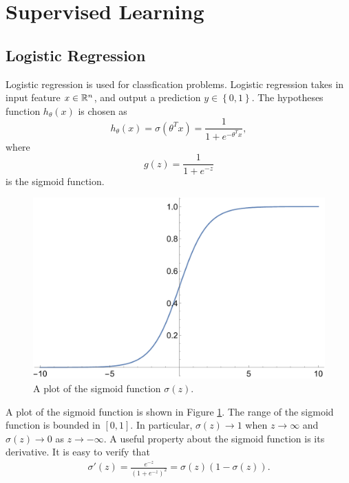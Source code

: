 \documentclass[a4paper]{article}
\begin{document}
\maketitle

\tableofcontents

\section{Supervised Learning}

\subsection{Logistic Regression}
Logistic regression is used for classfication problems.
Logistic regression takes in input feature $x \in \mathbb{R}^n$, and 
output a prediction $y \in \left\{ 0, 1 \right\}$. 
The hypotheses function $h_{\theta}(x)$ is chosen as 
\[
h_\theta(x) = \sigma(\theta^T x) = \frac{1}{1 + e^{- \theta^T x}},
\]
where 
\[
g(z) = \frac{1}{1 + e^{-z}}
\]
is the sigmoid function. 

\begin{figure}[H]
  \centering
  \includegraphics[width=0.5\linewidth]{fig/sigmoid.pdf}
  \caption{A plot of the sigmoid function $\sigma(z)$.}
  \label{sigmoid}
\end{figure}

A plot of the sigmoid function is shown in Figure 
\ref{sigmoid}. The range of the sigmoid function is bounded
in $[0, 1]$. In particular, $\sigma(z) \to 1$ when $z \to \infty$
and $\sigma(z) \to 0$ as $z \to - \infty$. A useful property
about the sigmoid function is its derivative. It is easy 
to verify that 
\[
\begin{aligned}
  \sigma'(z) 
  = \frac{e^{-z}}{(1 + e^{-z})^2}
  = \sigma(z) (1 - \sigma(z)).
\end{aligned}
\]
\end{document}
